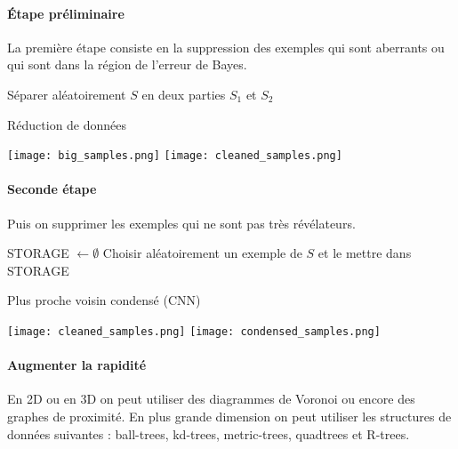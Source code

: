 \paragraph{Étape préliminaire}
La première étape consiste en la suppression des exemples qui sont aberrants ou qui sont dans la région de l'erreur de Bayes.
\begin{center}
	\begin{algorithm}[H]
		Séparer aléatoirement $S$ en deux parties $S_1$ et $S_2$\;
		\caption{Réduction de données}
	\end{algorithm}
	
	\texttt{[image: big\_samples.png]}
	\texttt{[image: cleaned\_samples.png]}
\end{center}

\paragraph{Seconde étape}
Puis on supprimer les exemples qui ne sont pas très révélateurs.
\begin{center}
	\begin{algorithm}[H]
		STORAGE $\gets \emptyset$\; 
		Choisir aléatoirement un exemple de $S$ et le mettre dans STORAGE\;
		\caption{Plus proche voisin condensé (CNN)}
	\end{algorithm}
	
	\texttt{[image: cleaned\_samples.png]}
	\texttt{[image: condensed\_samples.png]}
\end{center}

\paragraph{Augmenter la rapidité}
En 2D ou en 3D on peut utiliser des diagrammes de Voronoi ou encore des graphes de proximité.
En plus grande dimension on peut utiliser les structures de données suivantes : ball-trees, kd-trees, metric-trees, quadtrees et R-trees.

